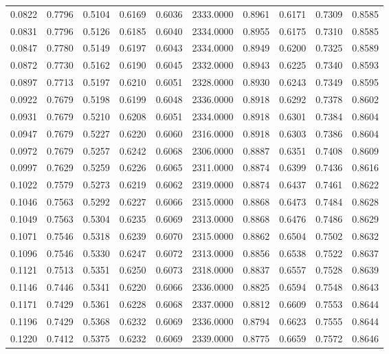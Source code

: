 \begin{tabular}{rrrrrrrrrr}
0.0822 & 0.7796 & 0.5104 & 0.6169 & 0.6036 & 2333.0000 & 0.8961 & 0.6171 & 0.7309 & 0.8585 \\
0.0831 & 0.7796 & 0.5126 & 0.6185 & 0.6040 & 2334.0000 & 0.8955 & 0.6175 & 0.7310 & 0.8585 \\
0.0847 & 0.7780 & 0.5149 & 0.6197 & 0.6043 & 2334.0000 & 0.8949 & 0.6200 & 0.7325 & 0.8589 \\
0.0872 & 0.7730 & 0.5162 & 0.6190 & 0.6045 & 2332.0000 & 0.8943 & 0.6225 & 0.7340 & 0.8593 \\
0.0897 & 0.7713 & 0.5197 & 0.6210 & 0.6051 & 2328.0000 & 0.8930 & 0.6243 & 0.7349 & 0.8595 \\
0.0922 & 0.7679 & 0.5198 & 0.6199 & 0.6048 & 2336.0000 & 0.8918 & 0.6292 & 0.7378 & 0.8602 \\
0.0931 & 0.7679 & 0.5210 & 0.6208 & 0.6051 & 2334.0000 & 0.8918 & 0.6301 & 0.7384 & 0.8604 \\
0.0947 & 0.7679 & 0.5227 & 0.6220 & 0.6060 & 2316.0000 & 0.8918 & 0.6303 & 0.7386 & 0.8604 \\
0.0972 & 0.7679 & 0.5257 & 0.6242 & 0.6068 & 2306.0000 & 0.8887 & 0.6351 & 0.7408 & 0.8609 \\
0.0997 & 0.7629 & 0.5259 & 0.6226 & 0.6065 & 2311.0000 & 0.8874 & 0.6399 & 0.7436 & 0.8616 \\
0.1022 & 0.7579 & 0.5273 & 0.6219 & 0.6062 & 2319.0000 & 0.8874 & 0.6437 & 0.7461 & 0.8622 \\
0.1046 & 0.7563 & 0.5292 & 0.6227 & 0.6066 & 2315.0000 & 0.8868 & 0.6473 & 0.7484 & 0.8628 \\
0.1049 & 0.7563 & 0.5304 & 0.6235 & 0.6069 & 2313.0000 & 0.8868 & 0.6476 & 0.7486 & 0.8629 \\
0.1071 & 0.7546 & 0.5318 & 0.6239 & 0.6070 & 2315.0000 & 0.8862 & 0.6504 & 0.7502 & 0.8632 \\
0.1096 & 0.7546 & 0.5330 & 0.6247 & 0.6072 & 2313.0000 & 0.8856 & 0.6538 & 0.7522 & 0.8637 \\
0.1121 & 0.7513 & 0.5351 & 0.6250 & 0.6073 & 2318.0000 & 0.8837 & 0.6557 & 0.7528 & 0.8639 \\
0.1146 & 0.7446 & 0.5341 & 0.6220 & 0.6066 & 2336.0000 & 0.8825 & 0.6594 & 0.7548 & 0.8643 \\
0.1171 & 0.7429 & 0.5361 & 0.6228 & 0.6068 & 2337.0000 & 0.8812 & 0.6609 & 0.7553 & 0.8644 \\
0.1196 & 0.7429 & 0.5368 & 0.6232 & 0.6069 & 2336.0000 & 0.8794 & 0.6623 & 0.7555 & 0.8644 \\
0.1220 & 0.7412 & 0.5375 & 0.6232 & 0.6069 & 2339.0000 & 0.8775 & 0.6659 & 0.7572 & 0.8646 \\

\end{tabular}
